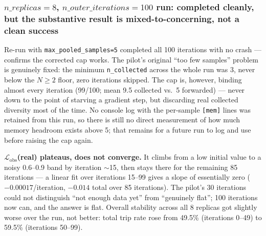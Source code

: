 \documentclass[11pt]{article}
\begin{document}
\subsubsection{$n\_replicas=8$, $n\_outer\_iterations=100$ run: completed cleanly, but the substantive result is mixed-to-concerning, not a clean success}
\label{sec:q4-stable-8x100}

Re-run with \texttt{max\_pooled\_samples=5} completed all 100 iterations
with no crash --- confirms the corrected cap works. The pilot's original
``too few samples'' problem is genuinely fixed: the minimum
\texttt{n\_collected} across the whole run was 3, never below the
$N\ge2$ floor, zero iterations skipped. The cap is, however, binding
almost every iteration (99/100; mean 9.5 collected vs.\ 5 forwarded) ---
never down to the point of starving a gradient step, but discarding real
collected diversity most of the time. No console log with the
per-sample \texttt{[mem]} lines was retained from this run, so there is
still no direct measurement of how much memory headroom exists above 5;
that remains for a future run to log and use before raising the cap
again.

\textbf{$\mathcal{L}_{\text{obs}}$(real) plateaus, does not converge.} It
climbs from a low initial value to a noisy 0.6--0.9 band by iteration
$\sim$15, then stays there for the remaining 85 iterations --- a linear
fit over iterations 15--99 gives a slope of essentially zero
($-0.00017$/iteration, $-0.014$ total over 85 iterations). The pilot's 30
iterations could not distinguish ``not enough data yet'' from ``genuinely
flat''; 100 iterations now can, and the answer is flat. Overall stability
across all 8 replicas got slightly worse over the run, not better: total
trip rate rose from 49.5\% (iterations 0--49) to 59.5\% (iterations
50--99).
\end{document}
